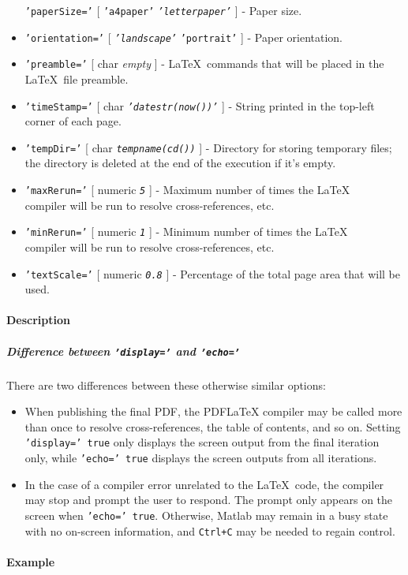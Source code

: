 \begin{itemize}
   \texttt{'paperSize='} {[} \texttt{'a4paper'} \textbar{}
   \emph{\texttt{'letterpaper'}} {]} - Paper size.
 \item
   \texttt{'orientation='} {[} \emph{\texttt{'landscape'}} \textbar{}
   \texttt{'portrait'} {]} - Paper orientation.
 \item
   \texttt{'preamble='} {[} char \textbar{} \emph{empty} {]} -
   \LaTeX~commands that will be placed in the \LaTeX~file preamble.
 \item
   \texttt{'timeStamp='} {[} char \textbar{}
   \emph{\texttt{'datestr(now())'}} {]} - String printed in the top-left
   corner of each page.
 \item
   \texttt{'tempDir='} {[} char \textbar{} \emph{\texttt{tempname(cd())}}
   {]} - Directory for storing temporary files; the directory is deleted
   at the end of the execution if it's empty.
 \item
   \texttt{'maxRerun='} {[} numeric \textbar{} \emph{\texttt{5}} {]} -
   Maximum number of times the \LaTeX\\compiler will be run to resolve
   cross-references, etc.
 \item
   \texttt{'minRerun='} {[} numeric \textbar{} \emph{\texttt{1}} {]} -
   Minimum number of times the \LaTeX\\compiler will be run to resolve
   cross-references, etc.
 \item
   \texttt{'textScale='} {[} numeric \textbar{} \emph{\texttt{0.8}} {]} -
   Percentage of the total page area that will be used.
 \end{itemize}
 
 \paragraph{Description}
 
 \subparagraph{Difference between \texttt{'display='} and
 \texttt{'echo='}}
 
 There are two differences between these otherwise similar options:
 
 \begin{itemize}
 \item
   When publishing the final PDF, the PDFLaTeX compiler may be called
   more than once to resolve cross-references, the table of contents, and
   so on. Setting \texttt{'display=' true} only displays the screen
   output from the final iteration only, while \texttt{'echo=' true}
   displays the screen outputs from all iterations.
 \item
   In the case of a compiler error unrelated to the \LaTeX~code, the
   compiler may stop and prompt the user to respond. The prompt only
   appears on the screen when \texttt{'echo=' true}. Otherwise, Matlab
   may remain in a busy state with no on-screen information, and
   \texttt{Ctrl+C} may be needed to regain control.
 \end{itemize}
 
 \paragraph{Example}


